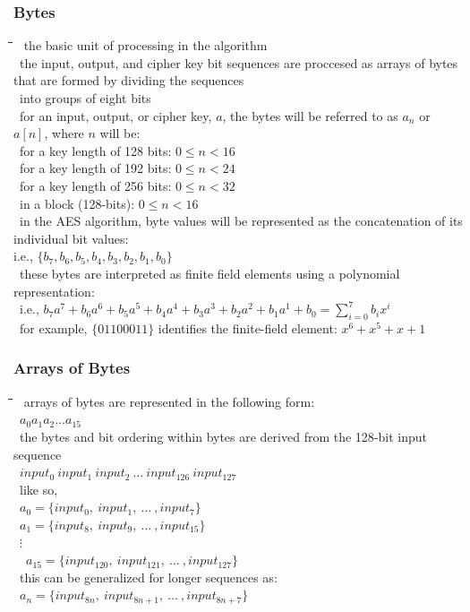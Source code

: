 \documentclass[10pt,letterpaper]{scrartcl}
\newcommand{\tbul}{\textbullet}
\newcommand{\tend}{\>\textendash}
\newcommand{\tasc}{\>\>\textasteriskcentered}
\newcommand{\tabDef}{\hspace{2em}\=\hspace{2em}\=\hspace{2em}\=\hspace{2em}\=\kill}
\begin{document}
\subsubsection*{Bytes}\begin{tabbing}\tabDef 
\tbul\ the basic unit of processing in the algorithm \\
\tbul\ the input, output, and cipher key bit sequences are proccesed as arrays of bytes that are formed by dividing the sequences\\ \>\ into groups of eight bits \\
\tbul\ for an input, output, or cipher key, $a$, the bytes will be referred to as $a_n$ or $a[n]$, where $n$ will be:  \\
    \tasc\ for a key length of 128 bits: $0\leq n < 16$ \\
    \tasc\ for a key length of 192 bits: $0\leq n < 24$ \\
    \tasc\ for a key length of 256 bits: $0\leq n < 32$ \\
    \tasc\ in a block (128-bits): $0\leq n < 16$ \\
\tbul\ in the AES algorithm, byte values will be represented as the concatenation of its individual bit values: \\ i.e., $\{b_7, b_6, b_5, b_4, b_3, b_2, b_1, b_0\}$\\
    \tend\ these bytes are interpreted as finite field elements using a polynomial representation: \\ 
    \>\>\ i.e., $\displaystyle b_7a^7+b_6a^6+b_5a^5+b_4a^4+b_3a^3+b_2a^2+b_1a^1+b_0 = \sum_{i=0}^7 b_ix^i$ \\
    \tend\ for example, $\{01100011\}$ identifies the finite-field element: $x^6 + x^5+x+1$\end{tabbing}
\subsubsection*{Arrays of Bytes}\begin{tabbing}\tabDef
\tbul\ arrays of bytes are represented in the following form: \\
    \tend\ $a_0a_1a_2\ldots a_{15}$ \\
\tbul\ the bytes and bit ordering within bytes are derived from the 128-bit input sequence \\
    \tend\ $input_0\ input_1\ input_2\ \ldots\ input_{126}\ input_{127}$ \\
\tbul\ like so, \\
    \tend\ $a_0 = \{input_0,\ input_1,\ \ldots\ , input_7\}$ \\
    \tend\ $a_1 = \{input_8,\ input_9,\ \ldots\ , input_{15}\}$ \\
    \>\>\ $\vdots$ \\
    \tend\ \tend\ $a_{15} = \{input_{120},\ input_{121},\ \ldots\ , input_{127}\}$ \\
\tbul\ this can be generalized for longer sequences as: \\
    \tend\ $a_n = \{input_{8n},\ input_{8n+1}, \ \ldots\ , input_{8n+7}\}$\end{tabbing}
\end{document}
